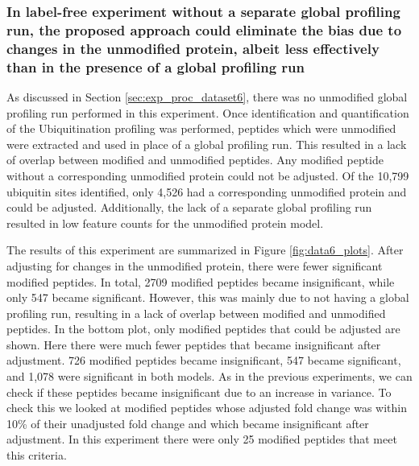 \documentclass[mcp]{article}
\numberwithin{table}{section}
\begin{document}
\subsubsection*{In label-free experiment without a separate global profiling run, the proposed approach could eliminate the bias due to changes in the unmodified protein, albeit less effectively than in the presence of a global profiling run}

As discussed in Section \ref{sec:exp_proc_dataset6}, there was no unmodified global profiling run performed in this experiment. Once identification and quantification of the Ubiquitination profiling was performed, peptides which were unmodified were extracted and used in place of a global profiling run. This resulted in a lack of overlap between modified and unmodified peptides. Any modified peptide without a corresponding unmodified protein could not be adjusted. Of the 10,799 ubiquitin sites identified, only 4,526 had a corresponding unmodified protein and could be adjusted. Additionally, the lack of a separate global profiling run resulted in low feature counts for the unmodified protein model.

The results of this experiment are summarized in Figure \ref{fig:data6_plots}. After adjusting for changes in the unmodified protein, there were fewer significant modified peptides. In total, 2709 modified peptides became insignificant, while only 547 became significant. However, this was mainly due to not having a global profiling run, resulting in a lack of overlap between modified and unmodified peptides. In the bottom plot, only modified peptides that could be adjusted are shown. Here there were much fewer peptides that became insignificant after adjustment. 726 modified peptides became insignificant, 547 became significant, and 1,078 were significant in both models. As in the previous experiments, we can check if these peptides became insignificant due to an increase in variance. To check this we looked at modified peptides whose adjusted fold change was within 10\% of their unadjusted fold change and which became insignificant after adjustment. In this experiment there were only 25 modified peptides that meet this criteria.

\end{document}
